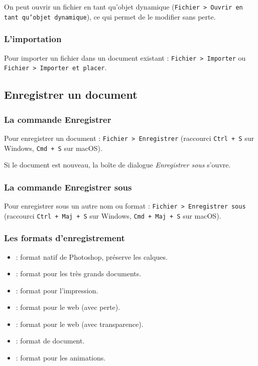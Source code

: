 On peut ouvrir un fichier en tant qu'objet dynamique (\texttt{Fichier > Ouvrir en tant qu'objet dynamique}), ce qui permet de le modifier sans perte.

\subsubsection{L'importation}

Pour importer un fichier dans un document existant : \texttt{Fichier > Importer} ou \texttt{Fichier > Importer et placer}.

\subsection{Enregistrer un document}

\subsubsection{La commande Enregistrer}

Pour enregistrer un document : \texttt{Fichier > Enregistrer} (raccourci \texttt{Ctrl + S} sur Windows, \texttt{Cmd + S} sur macOS).

Si le document est nouveau, la boîte de dialogue \emph{Enregistrer sous} s'ouvre.

\subsubsection{La commande Enregistrer sous}

Pour enregistrer sous un autre nom ou format : \texttt{Fichier > Enregistrer sous} (raccourci \texttt{Ctrl + Maj + S} sur Windows, \texttt{Cmd + Maj + S} sur macOS).

\subsubsection{Les formats d'enregistrement}

\begin{itemize}
    \item {} : format natif de Photoshop, préserve les calques.
    \item {} : format pour les très grands documents.
    \item {} : format pour l'impression.
    \item {} : format pour le web (avec perte).
    \item {} : format pour le web (avec transparence).
    \item {} : format de document.
    \item {} : format pour les animations.
\end{itemize}

